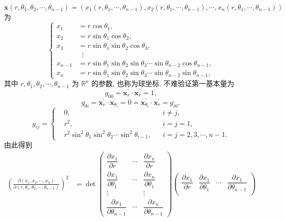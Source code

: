 \begin{example}
$\boldsymbol{x}(r, \theta_{1}, \theta_{2}, \cdots, \theta_{n-1}) = (x_{1}(r, \theta_{1}, \cdots, \theta_{n-1}), x_{2}(r, \theta_{1}, \cdots, \theta_{n-1}), \cdots, x_{n}(r, \theta_{1}, \cdots, \theta_{n-1}))$ 为
\[
  \left\{\begin{aligned}
    x_{1} &= r\cos\theta_{1}, \\
    x_{2} &= r\sin\theta_{1}\cos\theta_{2}, \\
    x_{3} &= r\sin\theta_{1}\sin\theta_{2}\cos\theta_{3}, \\
    &\;\;\vdots \\
    x_{n-1} &= r\sin\theta_{1}\sin\theta_{2}\sin\theta_{3}\cdots\sin\theta_{n-2}\cos\theta_{n-1}, \\
    x_{n} &= r\sin\theta_{1}\sin\theta_{2}\sin\theta_{3}\cdots\sin\theta_{n-2}\sin\theta_{n-1},
  \end{aligned}\right.
\]
其中 $r, \theta_{1}, \theta_{2}, \cdots, \theta_{n-1}$ 为 $\mathbb{R}^{n}$ 的参数, 也称为球坐标. 不难验证第一基本量为
\[
  g_{00} = \boldsymbol{x}_{r}^{\prime} \cdot \boldsymbol{x}_{r}^{\prime} = 1,
\]
\[
  g_{0i} = \boldsymbol{x}_{r}^{\prime} \cdot \boldsymbol{x}_{\theta_{i}}^{\prime} = 0 = \boldsymbol{x}_{\theta_{i}}^{\prime} \cdot \boldsymbol{x}_{r}^{\prime} = g_{i0},
\]
\[
  g_{ij} = \left\{\begin{aligned}
    &0, && i \neq j, \\
    &r^{2}, && i = j = 1, \\
    &r^{2}\sin^{2}\theta_{1}\sin^{2}\theta_{2}\cdots\sin^{2}\theta_{i-1}, && i = j = 2, 3, \cdots, n - 1.
  \end{aligned}\right.
\]
由此得到
\begin{align*}
  \left(\frac{\partial(x_{1}, x_{2}, \cdots, x_{n})}{\partial(r, \theta_{1}, \theta_{2}, \cdots, \theta_{n-1})}\right)^{2}
  &= \det\begin{pmatrix}
    \dfrac{\partial x_{1}}{\partial r} & \cdots & \dfrac{\partial x_{n}}{\partial r} \\
    \dfrac{\partial x_{1}}{\partial\theta_{1}} & \cdots & \dfrac{\partial x_{n}}{\partial\theta_{1}} \\
    \vdots & & \vdots \\
    \dfrac{\partial x_{1}}{\partial\theta_{n-1}} & \cdots & \dfrac{\partial x_{n}}{\partial\theta_{n-1}}
  \end{pmatrix}\begin{pmatrix}
    \dfrac{\partial x_{1}}{\partial r} & \dfrac{\partial x_{1}}{\partial\theta_{1}} & \cdots & \dfrac{\partial x_{1}}{\partial\theta_{n-1}} \\

\end{pmatrix}
\end{align*}
\end{example}
